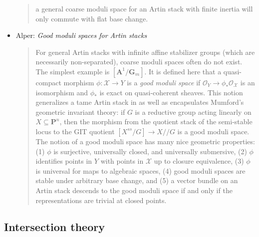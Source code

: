 \begin{itemize}
\begin{quote}
a general coarse moduli space for an Artin stack with finite inertia will only
commute with flat base change.
\end{quote}
\item Alper: \emph{Good moduli spaces for Artin stacks} \cite{alper_good}
\begin{quote}
For general Artin stacks with infinite affine stabilizer groups (which are
necessarily non-separated), coarse moduli spaces often do not exist. The
simplest example is $[\mathbf{A}^1 / \mathbf{G}_m]$. It is defined here that a
quasi-compact
morphism $\phi: \mathcal{X} \to Y$ is a \emph{good moduli space} if
$\mathcal{O}_Y \to \phi_*
\mathcal{O}_\mathcal{X}$ is an isomorphism and $\phi_*$ is exact on
quasi-coherent sheaves.
This notion generalizes a tame Artin stack in \cite{tame} as well as
encapsulates Mumford's geometric invariant theory: if $G$ is a reductive group
acting linearly on $X \subseteq \mathbf{P}^n$, then the morphism from the
quotient
stack of the semi-stable locus to the GIT quotient $[X^{ss}/G] \to X//G$ is a
good moduli space. The notion of a good moduli space has many nice geometric
properties: (1) $\phi$ is surjective, universally closed, and universally
submersive, (2) $\phi$ identifies points in $Y$ with points in $\mathcal{X}$ up
to
closure equivalence, (3) $\phi$ is universal for maps to algebraic spaces, (4)
good moduli spaces are stable under arbitrary base change, and (5) a vector
bundle on an Artin stack descends to the good moduli space if and only if the
representations are trivial at closed points.
\end{quote}
\end{itemize}


\subsection{Intersection theory}
\label{subsection-intersection-theory}


